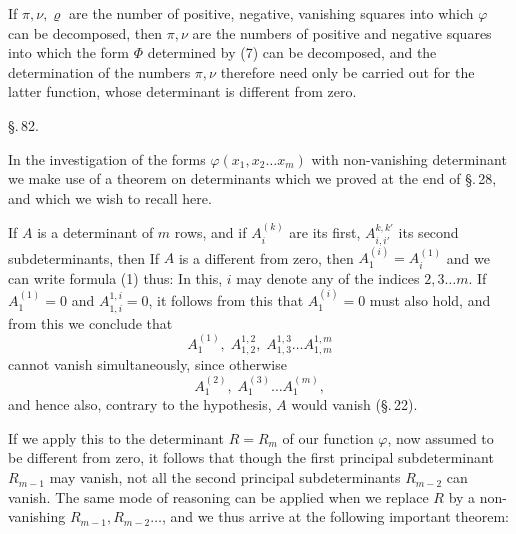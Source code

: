

If $\pi, \nu, \varrho$ are the number of positive, negative, vanishing squares into which $\varphi$ can be decomposed, then $\pi, \nu$ are the
numbers of positive and negative squares into which the
form $\Phi$ determined by (7) can be decomposed, and the determination of the numbers $\pi, \nu$ therefore need only be carried out for the latter function, whose determinant is different from
zero.

\begin{center}
\S.\,82.

\end{center}

In the investigation of the forms $\varphi(x_1, x_2 \ldots x_m)$ with non-vanishing determinant we make use of a theorem on determinants which we proved at the end of \S.\,28, and which
we wish to recall here.

If $A$ is a determinant of $m$ rows, and if $A_i^{(k)}$ are its
first, $A_{i,i'}^{k,k'}$ its second subdeterminants, then
If $A$ is a  different from zero, then $A_1^{(i)} = A_i^{(1)}$ and we can write formula (1)
thus:
In this, $i$ may denote any of the indices $2, 3 \ldots m$. If
$A_1^{(1)} = 0$ and $A_{1,i}^{1,i} = 0$, it follows from this that $A_1^{(i)} = 0$
must also hold, and from this we conclude that
\[
A_1^{(1)}, \; A_{1,2}^{1,2}, \; A_{1,3}^{1,3} \ldots A_{1,m}^{1,m}
\]
cannot vanish simultaneously, since otherwise
\[
A_1^{(2)}, \; A_1^{(3)} \ldots A_1^{(m)},
\]
and hence also, contrary to the hypothesis, $A$ would vanish (\S.\,22).

If we apply this to the determinant $R = R_m$ of our function $\varphi$, now assumed to be different from zero, it
follows that though the first principal subdeterminant $R_{m-1}$ may vanish,
not all the second principal subdeterminants $R_{m-2}$ can
vanish. The same mode of reasoning can be applied
when we replace $R$ by a non-vanishing $R_{m-1}, R_{m-2} \ldots$,
and we thus arrive at the following important theorem:
